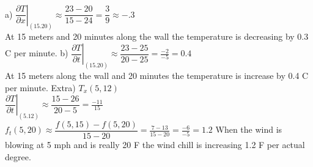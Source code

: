 \documentclass{article}
\begin{document}
\sol
\\ a) $\left.\dfrac{\partial T}{\partial x}\right|_{(15.20)} \approx \dfrac{23-20}{15-24} = \dfrac{3}{9} \approx -.3$ 
\\At 15 meters and 20 minutes along the wall the temperature is decreasing by 0.3 C per minute.
\double
b) $\left.\dfrac{\partial T}{\partial t}\right|_{(15.20)} \approx \dfrac{23-25}{20-25} = \frac{-2}{-5} = 0.4$
\\ At 15 meters along the wall and 20 minutes the temperature is increase by 0.4 C per minute. 
\double
Extra) $T_x(5,12)$
\\ $\left.\dfrac{\partial T}{\partial t}\right|_{(5.12)} \approx \dfrac{15-26}{20-5} = \frac{-11}{15}$
\sol\\
$f_t(5,20) \approx \dfrac{f(5,15) - f(5,20)}{15-20} = \frac{7-13}{15-20} = \frac{-6}{-5} = 1.2$
When the wind is blowing at 5 mph and is really 20 F the wind chill is increasing 1.2 F per actual degree.
\end{document}
